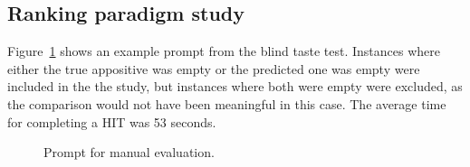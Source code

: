 \documentclass[11pt]{article}
\begin{document}
\subsection{Ranking paradigm study}
\label{taste_test}
Figure~\ref{fig:tastetest} shows an example prompt from the blind taste test. Instances where either the true appositive was empty or the predicted one was empty were included in the the study, but instances where both were empty were excluded, as the comparison would not have been meaningful in this case. The average time for completing a HIT was 53 seconds.
\begin{figure}
    \centering
    \caption{Prompt for manual evaluation.}
    \label{fig:tastetest}
\end{figure}
\end{document}
